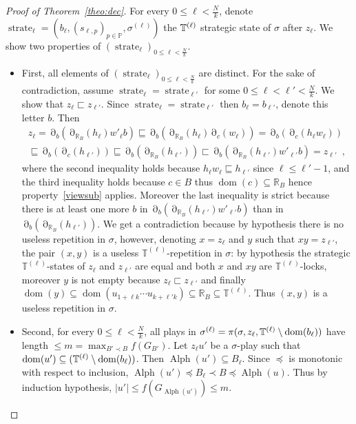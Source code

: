 \documentclass[a4paper,UKenglish]{lipics-v2016}
\newcommand{\sqsubsetneq}{\sqsubset}
\newcommand{\PP}{\mathbb{P}}
\newcommand{\TT}{\mathbb{T}}
\newcommand{\RR}{\mathbb{R}}
\newcommand{\pref}{\sqsubseteq}
\DeclareMathOperator{\dom}{dom}
\DeclareMathOperator{\view}{\partial}
\DeclareMathOperator{\alphabet}{Alph}
\DeclareMathOperator{\sstate}{strate}
\begin{document}
\begin{proof}[Proof of Theorem~\ref{theo:dec}]
For every $0\leq \ell < \frac{N}{k}$,
denote
$\sstate_\ell=\left(
b_\ell, 
\left(s_{\ell,p}\right)_{p\in\PP},
\sigma^{(\ell)}\right)
$
the $\Tl$ strategic state of $\sigma$ after $z_\ell$.
We show two properties of $(\sstate_\ell)_{0 \leq \ell < \frac{N}{k}}$.
\begin{itemize}
\item
First, all elements of $(\sstate_\ell)_{0 \leq \ell < \frac{N}{k}}$ are distinct.
For the sake of contradiction, assume $\sstate_\ell=\sstate_{\ell'}$
for some $0 \leq \ell < \ell' < \frac{N}{k}$.
We show that $z_\ell\sqsubsetneq z_{\ell'}$.
Since $\sstate_\ell=\sstate_{\ell'}$ then  $b_\ell=b_{\ell'}$, denote this letter $b$.
Then
\begin{multline*}
z_\ell
=\view_{b}(\view_{\RR_B}(h_\ell) w'_\ell b)
\pref\view_{b}(\view_{\RR_B}(h_\ell) \view_c(w_\ell))
 = \view_b(\view_c(h_\ell w_\ell))\\
\pref \view_b(\view_c(h_{\ell'} ))
\pref \view_b(\view_{{\RR_B}}(h_{\ell'}))
\sqsubsetneq
\view_{b}(\view_{{\RR_B}}(h_{\ell'}) w'_{\ell'} b)
= z_{\ell'}\enspace,
\end{multline*}
where the second inequality holds
because
$h_\ell w_\ell \pref h_{\ell'} $
since $\ell \leq \ell'-1$,
and the third inequality holds because $c \in B$
thus $\dom(c) \subseteq \RR_B$ hence property~\eqref{viewsub} applies.
Moreover the last inequality is strict because there is at least one more $b$ in
$\view_{b}(\view_{{\RR_B}}(h_{\ell'}) w'_{\ell'} b)$ than in $\view_{b}(\view_{{\RR_B}}(h_{\ell'}))$.
We get a contradiction because by hypothesis there is no useless repetition in $\sigma$,
however, denoting $x=z_\ell$ and $y$ such that $xy=z_{\ell'}$,
the pair $(x,y)$ is a useless $\TT^{(\ell)}$-repetition in $\sigma$:
by hypothesis the strategic $\TT^{(\ell)}$-states of $z_\ell$ and $z_{\ell'}$ are equal and both $x$ and $xy$ are $\TT^{(\ell)}$-locks, moreover $y$ is not empty because $z_\ell\sqsubsetneq z_{\ell'}$
and finally $\dom(y)\subseteq\dom(u_{1+\ell k}\cdots u_{k+ \ell' k}) \subseteq \RR_B \subseteq \TT^{(\ell)}$.
Thus $(x,y)$ is a useless repetition in $\sigma$.
\item
Second, for every $0\leq \ell < \frac{N}{k}$, 
all plays in $\sigma^{(\ell)}=\pi(\sigma,z_\ell,\Tl\setminus \dom(b_\ell))$ have length $\leq m= \max_{ B' \prec B} f\left(G_{B'}\right)$.
Let $z_\ell u'$ be a $\sigma$-play such that $\dom(u')\subseteq (\Tl\setminus \dom(b_\ell))$.
Then $\alphabet(u') \subseteq B_\ell$.
Since $\preceq$ is monotonic with respect to inclusion,
$
\alphabet(u') \preceq B_\ell\prec B \preceq \alphabet(u).
$
Thus by induction hypothesis,
$|u'| \leq f\left(G_{\alphabet(u')}\right)\leq m$.
\end{itemize}


\end{proof}
\end{document}
